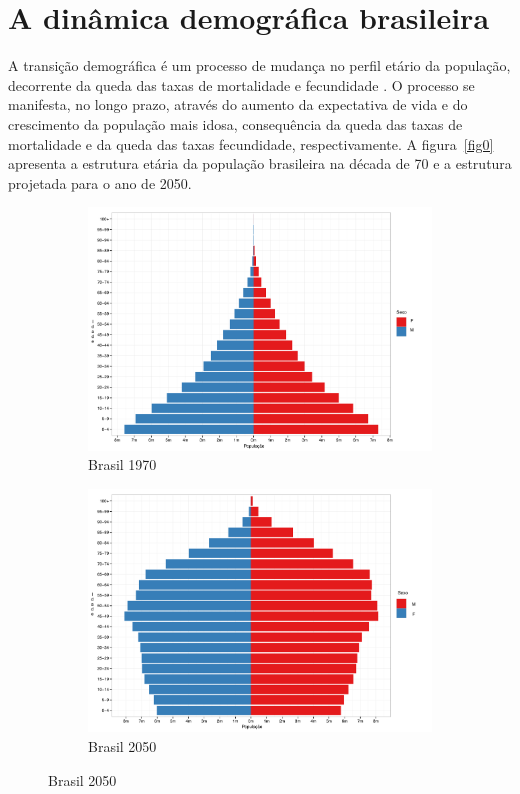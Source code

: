 \documentclass[12pt, 						%
			openright, 					%
			twoside,					%
			a4paper,x					%
			english,					%
			brazil]{abntex2}				%
\begin{document}
	\section{A dinâmica demográfica brasileira \label{sec1.2}}
	A transição demográfica é um processo de mudança no perfil etário da população, decorrente da  queda das taxas de mortalidade e fecundidade \cite{brito2008transiccao}. O processo se manifesta, no longo prazo, através do aumento da expectativa de vida e do crescimento da população mais idosa, consequência da queda das taxas de mortalidade e da queda das taxas fecundidade, respectivamente. A figura~\ref{fig0} apresenta a estrutura etária da população brasileira na década de 70 e a estrutura projetada para o ano de 2050.\\
	\begin{figure}[!htb]
	\caption{\label{fig0} Pirâmide Etária: Anos Selecionados}
		\begin{subfigure}[b]{0.5\textwidth}
		\begin{center}
			\caption{\label{fig0.1} Brasil 1970}
			\includegraphics[width=\textwidth]{Graphs/1970.pdf}
		\end{center}
		\end{subfigure}
	\hfill
		\begin{subfigure}[b]{0.5\textwidth}
		\begin{center}
			\caption{\label{fig0.2} Brasil 2050}
			\includegraphics[width=\textwidth]{Graphs/2050.pdf}

\end{center}
\end{subfigure}
\end{figure}
\end{document}
